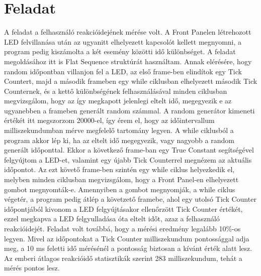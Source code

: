 \documentclass[10pt, conference,a4paper]{ITKproc}
\begin{document}
\section{Feladat}
A feladat a felhasználó reakcióidejének mérése volt. A Front Panelen létrehozott LED felvillanása után az ugyanitt elhelyezett kapcsolót kellett megnyomni, a program pedig kiszámolta a két esemény közötti idő különbséget. A feladat megoldásához itt is Flat Sequence struktúrát használtam. Annak elérésére, hogy random időpontban villanjon fel a LED, az első frame-ben elindítok egy Tick Countert, majd a második frameben egy while ciklusban elhelyezett második Tick Counternek, és a kettő különbségének felhasználásával minden ciklusban megvizsgálom, hogy az így megkapott jelenlegi eltelt idő, megegyezik e az ugyanebben a frameben generált random számmal. A random generátor kimeneti értékét itt megszorzom 20000-el, így érem el, hogy az időintervallum milliszekundumban mérve megfelelő tartomány legyen. A while ciklusból a program akkor lép ki, ha az eltelt idő megegyezik, vagy nagyobb a random generált időponttal. Ekkor a következő frame-ban egy True Constant segítségével felgyújtom a LED-et, valamint egy újabb Tick Counterrel megnézem az aktuális időpontot. Az ezt követő frame-ben szintén egy while ciklus helyezkedik el, melyben minden ciklusban megvizsgálom, hogy a Front Panel-en elhelyezett gombot megnyomták-e. Amennyiben a gombot megnyomják, a while ciklus végetér, a program pedig átlép a követzető framebe, ahol egy utolsó Tick Counter időpontjából kivonom a LED felgyújtásakor ellenőrzött Tick Counter értékét, ezzel megkapva a LED felgyulladása óta eltelt időt, azaz a felhasználó reakcióidejét. 
Feladat volt továbbá, hogy a mérési eredmény legalább 10\%-os legyen. Mivel az időpontokat a Tick Counter milliszekundum pontossággal adja meg, a 10 ms feletti idő mérésénél a pontosság biztosan a kívánt érték alatt lesz. Az emberi átlagos reakcióidő statisztikák szerint 283 milliszekundum, tehát a mérés pontos lesz. 
\end{document}
